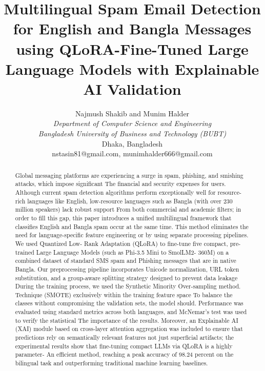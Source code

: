 \documentclass[journal]{IEEEtran}
\begin{document}
\title{Multilingual Spam Email Detection for English and Bangla Messages using QLoRA-Fine-Tuned Large Language Models with Explainable AI Validation}

\author{Najmush Shakib and Munim Halder \\
\textit{Department of Computer Science and Engineering} \\
\textit{Bangladesh University of Business and Technology (BUBT)} \\
Dhaka, Bangladesh \\
nstasin81@gmail.com, munimhalder666@gmail.com
}

\maketitle

\begin{abstract}
Global messaging platforms are experiencing a surge
in spam, phishing, and smishing attacks, which impose significant
The financial and security expenses for users. Although current spam
detection algorithms perform exceptionally well for resource-
rich languages like English, low-resource languages such as
Bangla (with over 230 million speakers) lack robust support
From both commercial and academic filters; in order to fill this gap, this
paper introduces a unified multilingual framework that classifies
English and Bangla spam occur at the same time. This method
eliminates the need for language-specific feature engineering
or by using separate processing pipelines. We used Quantized Low-
Rank Adaptation (QLoRA) to fine-tune five compact, pre-trained
Large Language Models (such as Phi-3.5 Mini to SmolLM2-
360M) on a combined dataset of standard SMS spam and
Phishing messages that are in native Bangla. Our preprocessing pipeline
incorporates Unicode normalization, URL token substitution, and
a group-aware splitting strategy designed to prevent data leakage
During the training process, we used the Synthetic Minority Over-sampling method.
Technique (SMOTE) exclusively within the training feature space
To balance the classes without compromising the validation sets, the model should. Performance was evaluated using standard metrics across both languages, and McNemar’s test was used to verify the statistical
The importance of the results. Moreover, an Explainable AI (XAI)
module based on cross-layer attention aggregation was included
to ensure that predictions rely on semantically relevant features
not just superficial artifacts; the experimental results show
that fine-tuning compact LLMs via QLoRA is a highly parameter-
An efficient method, reaching a peak accuracy of 98.24 percent on the bilingual task and outperforming traditional machine learning
baselines.
\end{abstract}
\end{document}

